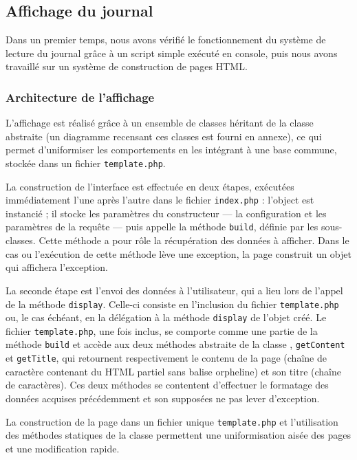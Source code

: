 \subsection{Affichage du journal}

Dans un premier temps, nous avons vérifié le fonctionnement du système de lecture du journal grâce à un script simple exécuté en console, puis nous avons travaillé sur un système de construction de pages HTML.

\subsubsection{Architecture de l’affichage}

L’affichage est réalisé grâce à un ensemble de classes héritant de la classe abstraite  (un diagramme recensant ces classes est fourni en annexe), ce qui permet d’uniformiser les comportements en les intégrant à une base commune, stockée dans un fichier \texttt{template.php}.

La construction de l’interface est effectuée en deux étapes, exécutées immédiatement l’une après l’autre dans le fichier \texttt{index.php} : l’object  est instancié ; il stocke les paramètres du constructeur — la configuration et les paramètres de la requête — puis appelle la méthode \texttt{build}, définie par les sous-classes. Cette méthode a pour rôle la récupération des données à afficher. Dans le cas ou l’exécution de cette méthode lève une exception, la page construit un objet  qui affichera l’exception.

La seconde étape est l’envoi des données à l’utilisateur, qui a lieu lors de l’appel de la méthode \texttt{display}. Celle-ci consiste en l’inclusion du fichier \texttt{template.php} ou, le cas échéant, en la délégation à la méthode \texttt{display} de l’objet  créé. Le fichier \texttt{template.php}, une fois inclus, se comporte comme une partie de la méthode \texttt{build} et accède aux deux méthodes abstraite de la classe , \texttt{getContent} et \texttt{getTitle}, qui retournent respectivement le contenu de la page (chaîne de caractère contenant du HTML partiel sans balise orpheline) et son titre (chaîne de caractères). Ces deux méthodes se contentent d’effectuer le formatage des données acquises précédemment et son supposées ne pas lever d’exception.

La construction de la page dans un fichier unique \texttt{template.php} et l’utilisation des méthodes statiques de la classe  permettent une uniformisation aisée des pages et une modification rapide.
